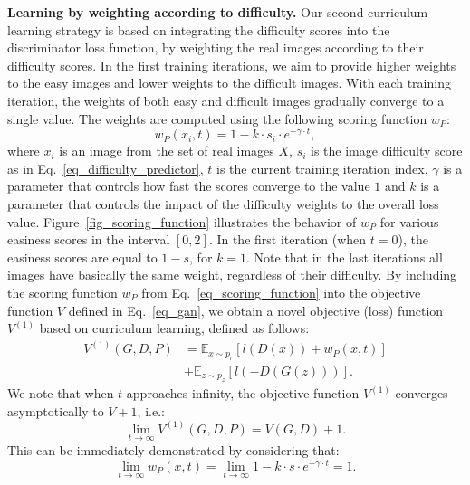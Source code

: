 \documentclass[10pt,twocolumn,letterpaper]{article}
\begin{document}
\noindent
{\bf Learning by weighting according to difficulty.}
Our second curriculum learning strategy is based on integrating the difficulty scores into the discriminator loss function, by weighting the real images according to their difficulty scores. In the first training iterations, we aim to provide higher weights to the easy images and lower weights to the difficult images. With each training iteration, the weights of both easy and difficult images gradually converge to a single value. The weights are computed using the following scoring function $w_P$:
\begin{equation}\label{eq_scoring_function}
w_P(x_i,t) = 1 - k \cdot s_i \cdot e^{-\gamma \cdot t},
\end{equation}
where $x_i$ is an image from the set of real images $X$, $s_i$ is the image difficulty score as in Eq.~\eqref{eq_difficulty_predictor}, $t$ is the current training iteration index, $\gamma$ is a parameter that controls how fast the scores converge to the value $1$ and $k$ is a parameter that controls the impact of the difficulty weights to the overall loss value. Figure~\ref{fig_scoring_function} illustrates the behavior of $w_P$ for various easiness scores in the interval $[0, 2]$. In the first iteration (when $t=0$), the easiness scores are equal to $1 - s$, for $k=1$. Note that in the last iterations all images have basically the same weight, regardless of their difficulty. By including the scoring function $w_P$ from Eq.~\eqref{eq_scoring_function} into the objective function $V$ defined in Eq.~\eqref{eq_gan}, we obtain a novel objective (loss) function $V^{(1)}$ based on curriculum learning, defined as follows:
\begin{equation}\label{eq_curriculum2}
\begin{split}
V^{(1)}(G,D,P) &= \mathbb{E}_{x \sim p_r}[l(D(x)) + w_P(x,t)]\\
&+ \mathbb{E}_{z \sim p_z}[l(-D(G(z)))].
\end{split}
\end{equation}
We note that when $t$ approaches infinity, the objective function $V^{(1)}$ converges asymptotically to $V + 1$, i.e.:
\begin{equation}
\lim_{t \rightarrow{\infty}}V^{(1)}(G,D,P) = V(G,D) + 1.
\end{equation}
This can be immediately demonstrated by considering that:
\begin{equation}\label{eq_scoring_convergence}
\lim_{t \rightarrow{\infty}} w_P(x,t) = \lim_{t \rightarrow{\infty}} 1 - k \cdot s \cdot e^{-\gamma \cdot t} = 1.
\end{equation}
\end{document}
